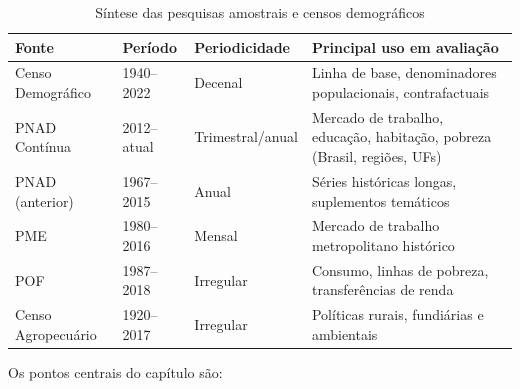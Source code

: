 \begin{table}[H]
\centering
\caption{Síntese das pesquisas amostrais e censos demográficos}
\label{tab:sintese_cap3}
\small
\begin{tabularx}{\textwidth}{@{} p{2.8cm} p{2.2cm} >{\raggedright\arraybackslash}p{2.5cm} X @{}}
\toprule
\textbf{Fonte} & \textbf{Período} & \textbf{Periodicidade} & \textbf{Principal uso em avaliação} \\
\midrule
Censo Demográfico    & 1940--2022  & Decenal      & Linha de base, denominadores populacionais, contrafactuais \\
PNAD Contínua        & 2012--atual & Trimestral\slash \allowbreak anual & Mercado de trabalho, educação, habitação, pobreza (Brasil, regiões, UFs) \\
PNAD (anterior)      & 1967--2015  & Anual        & Séries históricas longas, suplementos temáticos \\
PME                  & 1980--2016  & Mensal       & Mercado de trabalho metropolitano histórico \\
POF                  & 1987--2018  & Irregular    & Consumo, linhas de pobreza, transferências de renda \\
Censo Agropecuário   & 1920--2017  & Irregular    & Políticas rurais, fundiárias e ambientais \\
\bottomrule
\end{tabularx}
\end{table}

Os pontos centrais do capítulo são:

